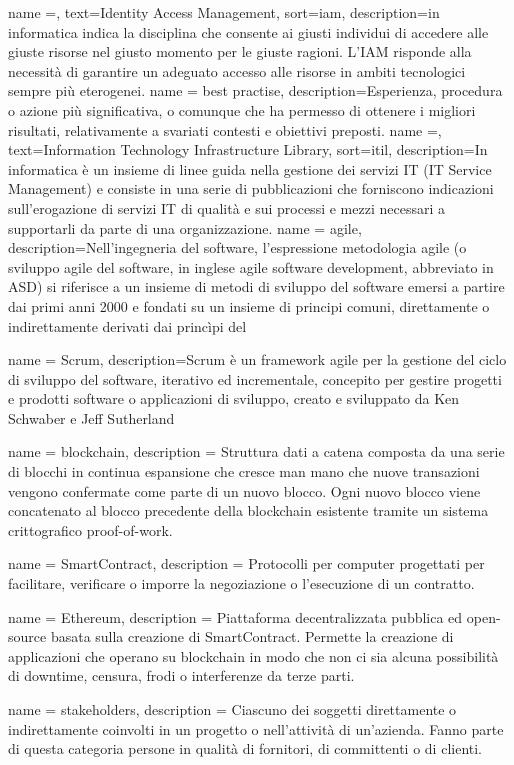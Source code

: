 {
    name =,
    text=Identity Access Management,
    sort=iam,
    description={in informatica indica la disciplina che consente ai giusti individui di accedere alle giuste risorse nel giusto
    momento per le giuste ragioni. L’IAM risponde alla necessità di garantire un
    adeguato accesso alle risorse in ambiti tecnologici sempre più eterogenei.}
}
{
    name = best practise,
    description={Esperienza, procedura o azione più significativa, o comunque che ha permesso di
    ottenere i migliori risultati, relativamente a svariati contesti e obiettivi preposti.}
}
{
    name =,
    text=Information
    Technology Infrastructure Library,
    sort=itil,
    description={In informatica è un insieme di linee guida nella gestione dei servizi IT (IT Service Management) e consiste in una serie di pubblicazioni che forniscono indicazioni sull'erogazione di servizi IT di qualità e sui processi e mezzi necessari a supportarli da parte di una organizzazione.}
}
{
    name = agile,
    description={Nell'ingegneria del software, l'espressione metodologia agile (o sviluppo agile del software, in inglese agile software development, abbreviato in ASD) si riferisce a un insieme di metodi di sviluppo del software emersi a partire dai primi anni 2000 e fondati su un insieme di principi comuni, direttamente o indirettamente derivati dai princìpi del \citep{site:agile-manifesto}}
}

{
    name = Scrum,
    description={Scrum è un framework agile per la gestione del ciclo di sviluppo del software, iterativo ed incrementale, concepito per gestire progetti e prodotti software o applicazioni di sviluppo, creato e sviluppato da Ken Schwaber e Jeff Sutherland}
}

{
	name = {blockchain},
	description = { Struttura dati a catena composta da una serie di blocchi in continua espansione che cresce man mano che nuove
			transazioni vengono confermate come parte di un nuovo blocco. Ogni nuovo blocco viene concatenato al blocco
			precedente della blockchain esistente tramite un sistema crittografico proof-of-work.
		}
}

{
	name = {SmartContract},
	description = { Protocolli per computer progettati per facilitare, verificare o imporre la negoziazione o l'esecuzione di un
			contratto.
		}
}

{
	name = {Ethereum},
	description = { Piattaforma decentralizzata pubblica ed open-source basata sulla creazione di
			SmartContract. Permette la creazione di applicazioni che operano su blockchain
			in modo che non ci sia alcuna possibilità di downtime, censura, frodi o interferenze
			da terze parti.
		}
}

{
	name = {stakeholders},
	description = { Ciascuno dei soggetti direttamente o indirettamente coinvolti in un progetto o nell'attività di un'azienda.
			Fanno parte di questa categoria persone in qualità di fornitori, di committenti o di clienti.
		}
}